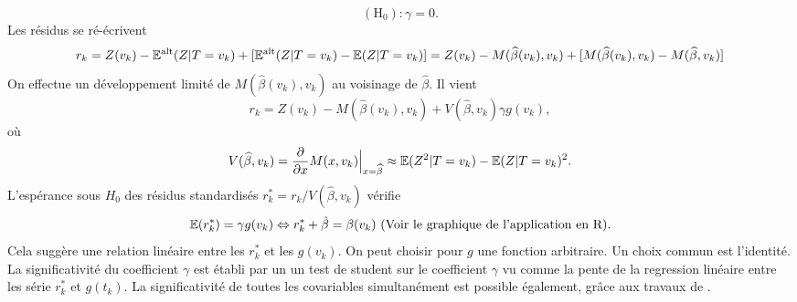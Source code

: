 $$
(\text{H}_0): \gamma = 0.
$$
Les résidus se ré-écrivent 
$$
r_k = Z(v_k) - \mathbb{E}^\text{alt}(Z|T = v_k) + [\mathbb{E}^\text{alt}(Z|T = v_k)-\mathbb{E}(Z|T = v_k)] = Z(v_k) - M(\widehat{\beta}(v_k), v_k) + [M(\widehat{\beta}(v_k), v_k)-M(\widehat{\beta}, v_k)]
$$
On effectue un développement limité de $M(\widehat{\beta}(v_k), v_k)$  au voisinage de $\widehat{\beta}$. Il vient 
$$
r_k = Z(v_k) - M(\widehat{\beta}(v_k), v_k) + V(\widehat{\beta}, v_k)\gamma g(v_k),
$$
où
$$
V(\widehat{\beta}, v_k) = \frac{\partial}{\partial x} M(x, v_k)\Big|_{x = \widehat{\beta}} \approx \mathbb{E}(Z^2|T = v_k) - \mathbb{E}(Z|T = v_k)^2.
$$
L'espérance sous $H_0$ des résidus standardisés $r_k^\ast  = r_k /V(\widehat{\beta}, v_k)$ vérifie 
$$
\mathbb{E}(r_k^\ast) = \gamma g(v_k)\Leftrightarrow r_k^\ast + \hat{\beta} = \beta(v_k)\text{ (Voir le graphique de l'application en R)}.
$$
Cela suggère une relation linéaire entre les $r_k^\ast$ et les $g(v_k)$. On peut choisir pour $g$ une fonction arbitraire. Un choix commun est l'identité. La significativité du coefficient $\gamma$ est établi par un un test de student sur le coefficient $\gamma$ vu comme la pente de la regression linéaire entre les série $r_k^\ast$ et $g(t_k)$. La significativité de toutes les covariables simultanément est possible également, grâce aux travaux de \citet{GRAMBSCH1994}.


